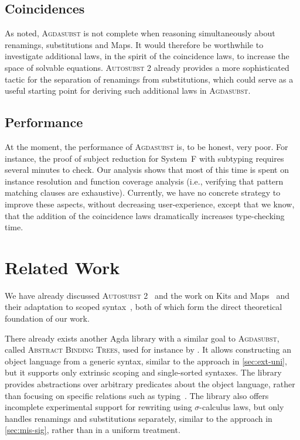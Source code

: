 \documentclass[screen,nonacm]{acmart}
\begin{document}
\subsection*{Coincidences}
As noted, \textsc{Agdasubst} is not complete when reasoning simultaneously
about renamings, substitutions and Maps. It would therefore be worthwhile to
investigate additional laws, in the spirit of the coincidence laws, to increase
the space of solvable equations. \textsc{Autosubst 2} already provides a more
sophisticated tactic for the separation of renamings from substitutions, which
could serve as a useful starting point for deriving such additional laws in
\textsc{Agdasubst}.

\subsection*{Performance}
At the moment, the performance of \textsc{Agdasubst} is, to be honest, very
poor. For instance, the proof of subject reduction for System~F with subtyping
requires several minutes to check. Our analysis shows that most of this time is
spent on instance resolution and function coverage analysis (i.e., verifying
that pattern matching clauses are exhaustive). Currently, we have no concrete
strategy to improve these aspects, without decreasing user-experience, except
that we know, that the addition of the coincidence laws dramatically increases
type-checking time.

\section{Related Work}
We have already discussed \textsc{Autosubst 2}~\cite{10.1145/3293880.3294101,
      schafer2015autosubst, Stark:2020:Mechanising} and the work on Kits and
Maps~\cite{ren-sub, stronglytyped, altenkirch2025substitution} and their
adaptation to scoped syntax~\cite{saffrich:LIPIcs.ITP.2024.32}, both of which
form the direct theoretical foundation of our work.

There already exists another Agda library with a similar goal to
\textsc{Agdasubst}, called \textsc{Abstract Binding Trees}, used for instance
by \citet{siek2021parameterized}. It allows constructing an object language
from a generic syntax, similar to the approach in \cref{sec:ext-uni}, but it
supports only extrinsic scoping and single-sorted syntaxes. The library provides
abstractions over arbitrary predicates about the object language, rather than
focusing on specific relations such as
typing~\cite{saffrich:LIPIcs.ITP.2024.32}. The library also offers incomplete
experimental support for rewriting using $\sigma$-calculus laws, but only
handles renamings and substitutions separately, similar to the approach in
\cref{sec:mis-sig}, rather than in a uniform treatment.
\end{document}
